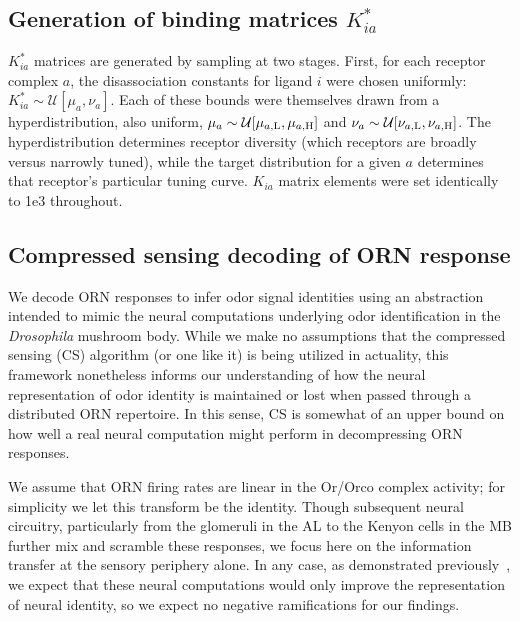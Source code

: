 \subsection{Generation of binding matrices $K^*_{ia}$}
$K_{ia}^*$ matrices are generated by sampling at two stages. First, for each receptor complex $a$, the disassociation constants for ligand $i$ were chosen uniformly: $K^*_{ia} \sim \mathcal U[\mu_a, \nu_a]$. Each of these bounds were themselves drawn from a hyperdistribution, also uniform, $\mu_a \sim \mathcal U[\mu_{a, \text L}, \mu_{a, \text H}]$ and $\nu_a \sim \mathcal U[\nu_{a, \text L}, \nu_{a, \text H}]$. The hyperdistribution determines receptor diversity (which receptors are broadly versus narrowly tuned), while the target distribution for a given $a$ determines that receptor's particular tuning curve. $K_{ia}$ matrix elements were set identically to 1e3 throughout. 


\subsection{Compressed sensing decoding of ORN response}
We decode ORN responses to infer odor signal identities using an abstraction intended to mimic the neural computations underlying odor identification in the \textit{Drosophila} mushroom body. While we make no assumptions that the compressed sensing (CS) algorithm (or one like it) is being utilized in actuality, this framework nonetheless informs our understanding of how the neural representation of odor identity is maintained or lost when passed through a distributed ORN repertoire. In this sense, CS is somewhat of an upper bound on how well a real neural computation might perform in decompressing ORN responses.

We assume that ORN firing rates are linear in the Or/Orco complex activity; for simplicity we let this transform be the identity. Though subsequent neural circuitry, particularly from the glomeruli in the AL to the Kenyon cells in the MB further mix and scramble these responses, we focus here on the information transfer at the sensory periphery alone. In any case, as demonstrated previously~\cite{vijay_1}, we expect that these neural computations would only improve the representation of neural identity, so we expect no negative ramifications for our findings.

